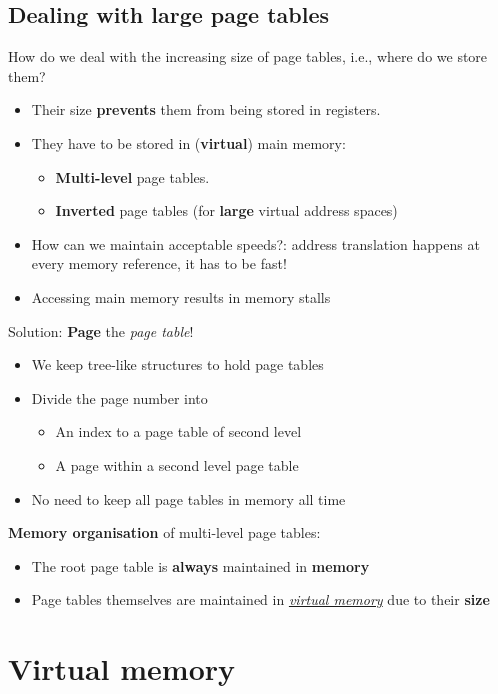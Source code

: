 \documentclass{article}
\newcommand{\worddef}[1]{\hyperref[sec:reference]{\textit{#1}}}
\begin{document}
\subsection{Dealing with large page tables}
\begin{flushleft}
How do we deal with the increasing size of page tables, i.e., where do we store them?
\begin{itemize}
	\item Their size \textbf{prevents} them from being stored in registers.
	\item They have to be stored in (\textbf{virtual}) main memory:
	\begin{itemize}
		\item \textbf{Multi-level} page tables.
		\item \textbf{Inverted} page tables (for \textbf{large} virtual address spaces)
	\end{itemize}
	\item How can we maintain acceptable speeds?: address translation happens at every memory reference, it has to be fast!
	\item Accessing main memory results in memory stalls
\end{itemize}
\bigskip
Solution: \textbf{Page} the \textit{page table}!
\begin{itemize}
	\item We keep tree-like structures to hold page tables
	\item Divide the page number into
	\begin{itemize}
		\item An index to a page table of second level
		\item A page within a second level page table
	\end{itemize}	
	\item No need to keep all page tables in memory all time
\end{itemize}
\textbf{Memory organisation} of multi-level page tables:
\begin{itemize}
	\item The root page table is \textbf{always} maintained in \textbf{memory}
	\item Page tables themselves are maintained in \worddef{virtual memory} due to their \textbf{size}
\end{itemize}
\end{flushleft}

\section{Virtual memory}
\end{document}
